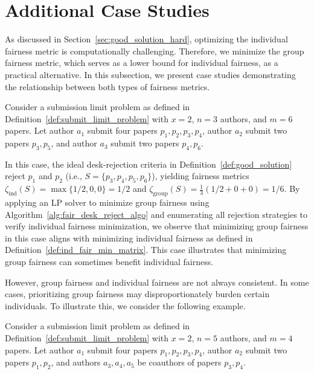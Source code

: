 \section{Additional Case Studies}\label{sec:more_case_study}

As discussed in Section~\ref{sec:good_solution_hard}, optimizing the individual fairness metric is computationally challenging. Therefore, we minimize the group fairness metric, which serves as a lower bound for individual fairness, as a practical alternative. In this subsection, we present case studies demonstrating the relationship between both types of fairness metrics. 

\begin{example}
Consider a submission limit problem as defined in Definition~\ref{def:submit_limit_problem} with $x = 2$, $n = 3$ authors, and $m = 6$ papers. Let author $a_1$ submit four papers $p_1, p_2, p_3, p_4$, author $a_2$ submit two papers $p_3, p_5$, and author $a_3$ submit two papers $p_4, p_6$. 
\end{example}

In this case, the ideal desk-rejection criteria in Definition~\ref{def:good_solution} reject $p_1$ and $p_2$ (i.e., $S = \{p_3, p_4, p_5, p_6\}$), yielding fairness metrics $\zeta_{\mathrm{ind}}(S) = \max\{1/2, 0, 0\} = 1/2$ and $\zeta_{\mathrm{group}}(S) = \frac{1}{3}(1/2 + 0 + 0) = 1/6$. By applying an LP solver to minimize group fairness using Algorithm~\ref{alg:fair_desk_reject_algo} and enumerating all rejection strategies to verify individual fairness minimization, we observe that minimizing group fairness in this case aligns with minimizing individual fairness as defined in Definition~\ref{def:ind_fair_min_matrix}. This case illustrates that minimizing group fairness can sometimes benefit individual fairness.

However, group fairness and individual fairness are not always consistent. In some cases, prioritizing group fairness may disproportionately burden certain individuals. To illustrate this, we consider the following example.

\begin{example}
    Consider a submission limit problem as defined in Definition~\ref{def:submit_limit_problem} with $x = 2$, $n = 5$ authors, and $m = 4$ papers. Let author $a_1$ submit four papers $p_1, p_2, p_3, p_4$, author $a_2$ submit two papers $p_1, p_2$, and authors $a_3, a_4, a_5$ be coauthors of papers $p_3, p_4$. 
\end{example}

